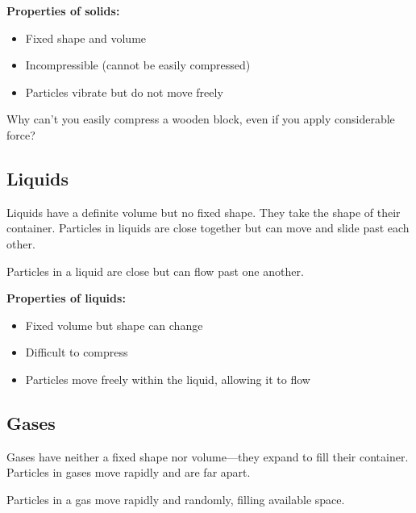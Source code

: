 \textbf{Properties of solids:}
\begin{itemize}
    \item Fixed shape and volume
    \item Incompressible (cannot be easily compressed)
    \item Particles vibrate but do not move freely
\end{itemize}

\begin{stopandthink}
Why can't you easily compress a wooden block, even if you apply considerable force?
\end{stopandthink}

\subsection{Liquids}

Liquids have a definite volume but no fixed shape. They take the shape of their container. Particles in liquids are close together but can move and slide past each other.

\begin{marginfigure}
\caption{Particles in a liquid are close but can flow past one another.}
\end{marginfigure}

\textbf{Properties of liquids:}
\begin{itemize}
    \item Fixed volume but shape can change
    \item Difficult to compress
    \item Particles move freely within the liquid, allowing it to flow
\end{itemize}

\subsection{Gases}

Gases have neither a fixed shape nor volume—they expand to fill their container. Particles in gases move rapidly and are far apart.

\begin{marginfigure}
\caption{Particles in a gas move rapidly and randomly, filling available space.}
\end{marginfigure}

